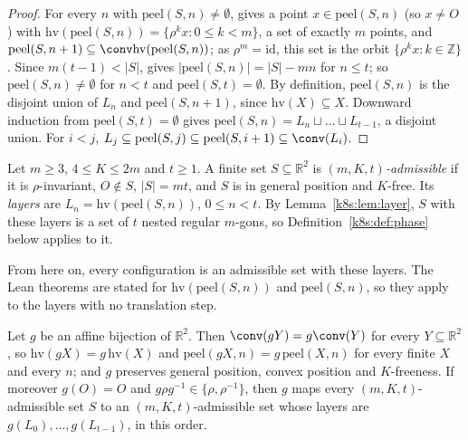 \begin{proof}
For every $n$ with $\mathrm{peel}(S,n)\ne\emptyset$,  gives a point $x\in\mathrm{peel}(S,n)$ (so
$x\ne O$) with $\mathrm{hv}(\mathrm{peel}(S,n))=\{\rho^kx:0\le k<m\}$, a set of exactly $m$ points, and
$\mathrm{peel}(S,n+1)\subseteq\conv\mathrm{hv}(\mathrm{peel}(S,n))$; as $\rho^m=\mathrm{id}$, this set is the orbit
$\{\rho^kx:k\in\mathbb Z\}$. Since $m(t-1)<|S|$,  gives $|\mathrm{peel}(S,n)|=|S|-mn$ for $n\le t$; so
$\mathrm{peel}(S,n)\ne\emptyset$ for $n<t$ and $\mathrm{peel}(S,t)=\emptyset$. By definition, $\mathrm{peel}(S,n)$ is the
disjoint union of $L_n$ and $\mathrm{peel}(S,n+1)$, since $\mathrm{hv}(X)\subseteq X$. Downward induction from
$\mathrm{peel}(S,t)=\emptyset$ gives $\mathrm{peel}(S,n)=L_n\sqcup\dots\sqcup L_{t-1}$, a disjoint union. For $i<j$,
$L_j\subseteq\mathrm{peel}(S,j)\subseteq\mathrm{peel}(S,i+1)\subseteq\conv(L_i)$.
\end{proof}

\begin{definition}\label{k8s:def:adm}
Let $m\ge3$, $4\le K\le2m$ and $t\ge1$. A finite set $S\subseteq\mathbb R^2$ is \emph{$(m,K,t)$-admissible} if it is
$\rho$-invariant, $O\notin S$, $|S|=mt$, and $S$ is in general position and $K$-free. Its \emph{layers} are
$L_n=\mathrm{hv}(\mathrm{peel}(S,n))$, $0\le n<t$. By Lemma~\ref{k8s:lem:layer}, $S$ with these layers is a set of $t$
nested regular $m$-gons, so Definition~\ref{k8s:def:phase} below applies to it.
\end{definition}

From here on, every configuration is an admissible set with these layers. The Lean theorems are stated for
$\mathrm{hv}(\mathrm{peel}(S,n))$ and $\mathrm{peel}(S,n)$, so they apply to the layers with no translation step.

\begin{lemma}\label{k8s:lem:affine}
Let $g$ be an affine bijection of $\mathbb R^2$. Then $\conv(gY)=g\conv(Y)$ for every $Y\subseteq\mathbb R^2$, so
$\mathrm{hv}(gX)=g\,\mathrm{hv}(X)$ and $\mathrm{peel}(gX,n)=g\,\mathrm{peel}(X,n)$ for every finite $X$ and every $n$; and $g$
preserves general position, convex position and $K$-freeness. If moreover $g(O)=O$ and $g\rho g^{-1}\in\{\rho,\rho^{-1}\}$,
then $g$ maps every $(m,K,t)$-admissible set $S$ to an $(m,K,t)$-admissible set whose layers are
$g(L_0),\dots,g(L_{t-1})$, in this order.
\end{lemma}

